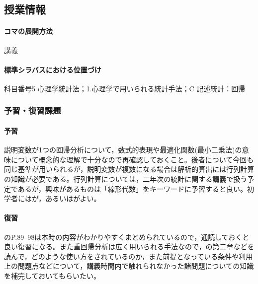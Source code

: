 \subsection{授業情報}
\paragraph{コマの展開方法}
講義
\paragraph{標準シラバスにおける位置づけ}
科目番号5 心理学統計法；1.心理学で用いられる統計手法；C 記述統計：回帰
\subsubsection{予習・復習課題}
\paragraph{予習}
説明変数が1つの回帰分析について，数式的表現や最適化関数(最小二乗法)の意味について概念的な理解で十分なので再確認しておくこと。後者について今回も同じ基準が用いられるが，説明変数が複数になる場合は解析的算出には行列計算の知識が必要である。行列計算については，二年次の統計に関する講義で扱う予定であるが，興味があるものは「線形代数」をキーワードに予習すると良い。初学者には\citet{結城201810}が，あるいは\citet{岡太200804}がよい。
\paragraph{復習}
\citet{豊田201706}のP.89--98は本時の内容がわかりやすくまとめられているので，通読しておくと良い復習になる。また重回帰分析は広く用いられる手法なので，\citet{kosugi2016a}の第二章などを読んで，どのような使い方をされているのか，また前提となっている条件や利用上の問題点などについて，講義時間内で触れられなかった諸問題についての知識を補完しておいてもらいたい。
